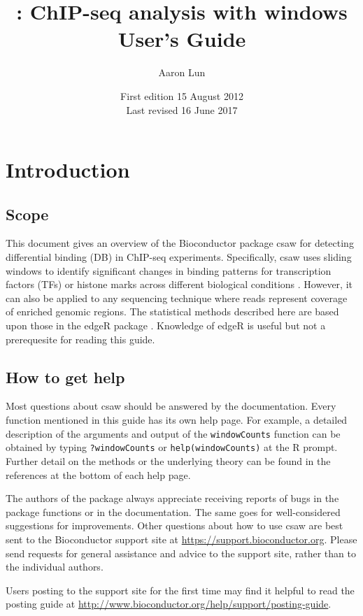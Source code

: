 \documentclass[12pt]{report}
\title{\pkgname{}: ChIP-seq analysis with windows \\ \vspace{0.2in} User's Guide}
\author{Aaron Lun}
\date{First edition 15 August 2012\\
\vspace{6pt}
Last revised 16 June 2017}
\newcommand{\edger}{edgeR}
\newcommand{\pkgname}{csaw}
\newcommand{\code}[1]{{\small\texttt{#1}}}
\newcommand{\R}{\textsf{R}}
\begin{document}
\maketitle
\tableofcontents


\newpage
{}

\chapter{Introduction}
\section{Scope}
This document gives an overview of the Bioconductor package \pkgname{} for detecting differential binding (DB) in ChIP-seq experiments.
Specifically, \pkgname{} uses sliding windows to identify significant changes in binding patterns for transcription factors (TFs) or histone marks across different biological conditions \citep{lun2016csaw}.
However, it can also be applied to any sequencing technique where reads represent coverage of enriched genomic regions.
The statistical methods described here are based upon those in the \edger{} package \citep{robinson2010}. 
Knowledge of \edger{} is useful but not a prerequesite for reading this guide.

\section{How to get help}
Most questions about \pkgname{} should be answered by the documentation. 
Every function mentioned in this guide has its own help page. 
For example, a detailed description of the arguments and output of the \code{windowCounts} function can be obtained by typing \code{?windowCounts} or \code{help(windowCounts)} at the \R{} prompt. 
Further detail on the methods or the underlying theory can be found in the references at the bottom of each help page.

The authors of the package always appreciate receiving reports of bugs in the package functions or in the documentation. 
The same goes for well-considered suggestions for improvements. 
Other questions about how to use \pkgname{} are best sent to the Bioconductor support site at \url{https://support.bioconductor.org}.
Please send requests for general assistance and advice to the support site, rather than to the individual authors. 

Users posting to the support site for the first time may find it helpful to read the posting guide at \url{http://www.bioconductor.org/help/support/posting-guide}.
\end{document}
